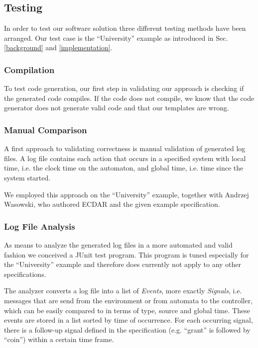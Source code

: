\subsection{Testing}
\label{Testing}
In order to test our software solution three different testing methods have been
arranged. Our test case is the ``University'' example as introduced in
Sec. \ref{background} and \ref{implementation}.


\subsubsection{Compilation}

To test code generation, our first step in validating our approach is checking
if the generated code compiles. If the code does not compile, we know that the
code generator does not generate valid code and that our templates are wrong.


\subsubsection{Manual Comparison}

A first approach to validating correctness is manual validation of generated log
files. A log file contains each action that occurs in a specified system with
local time, i.e. the clock time on the automaton, and global time, i.e. time
since the system started.

We employed this approach on the ``University'' example, together with Andrzej
Wasowski, who authored ECDAR and the given example specification.

\subsubsection{Log File Analysis}

As means to analyze the generated log files in a more automated and valid
fashion we conceived a JUnit test program. This program is tuned especially for
the ``University'' example and therefore does currently not apply to any other
specifications.

The analyzer converts a log file into a list of \textit{Events}, more exactly
\textit{Signals}, i.e. messages that are send from the environment or from automata
to the controller, which can be easily compared to in terms of type, source and
global time. These events are stored in a list sorted by time of occurrence. For
each occurring signal, there is a follow-up signal defined in the specification
(e.g. ``grant'' is followed by ``coin'') within a certain time frame.

